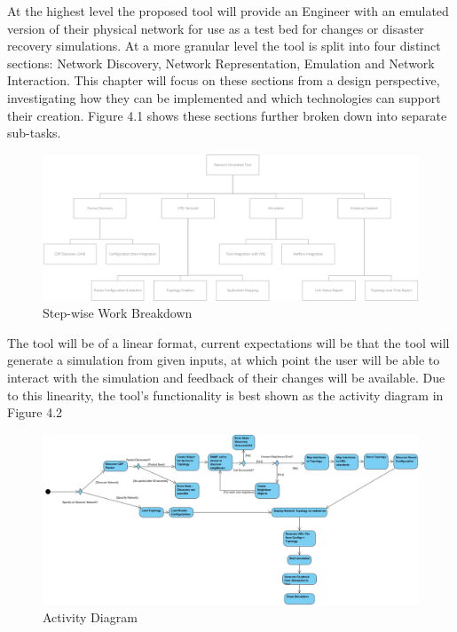 \documentclass[11pt]{report}
\begin{document}
At the highest level the proposed tool will provide an Engineer with an emulated version of their physical network for use as a test bed for changes or disaster recovery simulations. At a more granular level the tool is split into four distinct sections: Network Discovery, Network Representation, Emulation and Network Interaction. This chapter will focus on these sections from a design perspective, investigating how they can be implemented and which technologies can support their creation. Figure 4.1 shows these sections further broken down into separate sub-tasks.

\begin{figure}[h!]
	\caption{Step-wise Work Breakdown}
	\centering
	\includegraphics[width=1\textwidth]{work-Breakdown.png}
\end{figure}

The tool will be of a linear format, current expectations will be that the tool will generate a simulation from given inputs, at which point the user will be able to interact with the simulation and feedback of their changes will be available. Due to this linearity, the tool's functionality is best shown as the activity diagram in Figure 4.2 

\FloatBarrier
\begin{figure}
	\caption{Activity Diagram}
	\includegraphics[width=1\textwidth]{activityDiagram.png}
\end{figure}
\FloatBarrier
\end{document}
